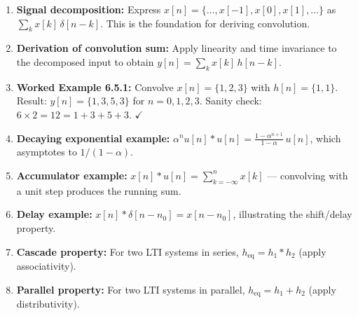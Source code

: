 \documentclass[11pt]{article}
\begin{document}
\begin{enumerate}
  \item \textbf{Signal decomposition:} Express $x[n] = \{\ldots, x[-1], x[0], x[1], \ldots\}$ as $\sum_k x[k]\,\delta[n-k]$. This is the foundation for deriving convolution.
  \item \textbf{Derivation of convolution sum:} Apply linearity and time invariance to the decomposed input to obtain $y[n] = \sum_k x[k]\,h[n-k]$.
  \item \textbf{Worked Example 6.5.1:} Convolve $x[n]=\{1,2,3\}$ with $h[n]=\{1,1\}$. Result: $y[n] = \{1,3,5,3\}$ for $n=0,1,2,3$. Sanity check: $6 \times 2 = 12 = 1+3+5+3$. $\checkmark$
  \item \textbf{Decaying exponential example:} $\alpha^n u[n] * u[n] = \frac{1-\alpha^{n+1}}{1-\alpha}\,u[n]$, which asymptotes to $1/(1-\alpha)$.
  \item \textbf{Accumulator example:} $x[n]*u[n] = \sum_{k=-\infty}^{n} x[k]$ — convolving with a unit step produces the running sum.
  \item \textbf{Delay example:} $x[n]*\delta[n-n_0] = x[n-n_0]$, illustrating the shift/delay property.
  \item \textbf{Cascade property:} For two LTI systems in series, $h_{\text{eq}} = h_1 * h_2$ (apply associativity).
  \item \textbf{Parallel property:} For two LTI systems in parallel, $h_{\text{eq}} = h_1 + h_2$ (apply distributivity).
\end{enumerate}
\end{document}

